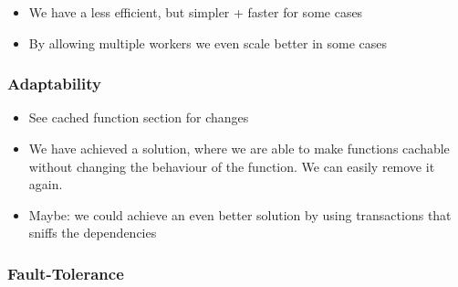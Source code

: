 \begin{itemize}
  \item We have a less efficient, but simpler + faster for some cases
  \item By allowing multiple workers we even scale better in some cases
\end{itemize}



\subsubsection{Adaptability}
\label{subsubsec:adaptability}


\begin{itemize}
  \item See cached function section for changes
  \item We have achieved a solution, where we are able to make functions cachable without changing the behaviour of the function. We can easily remove it again.
  \item Maybe: we could achieve an even better solution by using transactions that sniffs the dependencies
\end{itemize}


\subsubsection{Fault-Tolerance}
\label{subsubsec:fault-tolerance}






